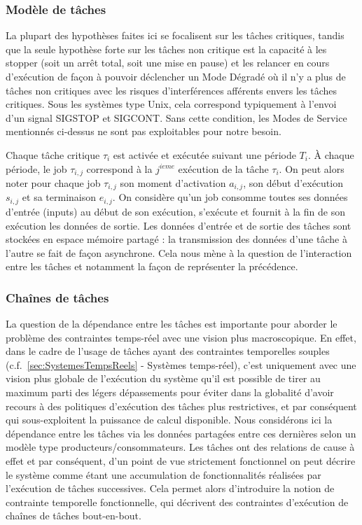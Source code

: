 \documentclass[french, a4paper, 11pt, twoside, pdftex]{StyleThese}
\begin{document}
    	
    	\subsubsection{Modèle de tâches}
		La plupart des hypothèses faites ici se focalisent sur les tâches critiques, tandis que la seule hypothèse forte sur les tâches non critique est la capacité à les stopper (soit un arrêt total, soit une mise en pause) et les relancer en cours d'exécution de façon à pouvoir déclencher un Mode Dégradé où il n'y a plus de tâches non critiques avec les risques d'interférences afférents envers les tâches critiques. Sous les systèmes type Unix, cela correspond typiquement à l'envoi d'un signal SIGSTOP et SIGCONT. Sans cette condition, les Modes de Service mentionnés ci-dessus ne sont pas exploitables pour notre besoin. 
		
		Chaque tâche critique $\tau_i$ est activée et exécutée suivant une période $T_i$. 
		À chaque période, le job $\tau_{i,j}$ correspond à la $j^{ieme}$ exécution de la tâche $\tau_i$. 
		On peut alors noter pour chaque job $\tau_{i,j}$ son moment d'activation $a_{i,j}$, son début d'exécution $s_{i,j}$ et sa terminaison $e_{i,j}$. 
		On considère qu'un job consomme toutes ses données d'entrée (inputs) au début de son exécution, s'exécute et fournit à la fin de son exécution les données de sortie. Les données d'entrée et de sortie des tâches sont stockées en espace mémoire partagé : la transmission des données d'une tâche à l'autre se fait de façon asynchrone.
		Cela nous mène à la question de l'interaction entre les tâches et notamment la façon de représenter la précédence.
    	
    	\subsubsection{Chaînes de tâches}
	    La question de la dépendance entre les tâches est importante pour aborder le problème des contraintes temps-réel avec une vision plus macroscopique. En effet, dans le cadre de l'usage de tâches ayant des contraintes temporelles souples (c.f.~\autoref{sec:SystemesTempsReels} - Systèmes temps-réel), c'est uniquement avec une vision plus globale de l'exécution du système qu'il est possible de tirer au maximum parti des légers dépassements pour éviter dans la globalité d'avoir recours à des politiques d'exécution des tâches plus restrictives, et par conséquent qui sous-exploitent la puissance de calcul disponible.
	    Nous considérons ici la dépendance entre les tâches via les données partagées entre ces dernières selon un modèle type producteurs/consommateurs. Les tâches ont des relations de cause à effet et par conséquent, d'un point de vue strictement fonctionnel on peut décrire le système comme étant une accumulation de fonctionnalités réalisées par l'exécution de tâches successives. Cela permet alors d'introduire la notion de contrainte temporelle fonctionnelle, qui décrivent des contraintes d'exécution de chaînes de tâches bout-en-bout.
	    
\end{document}
